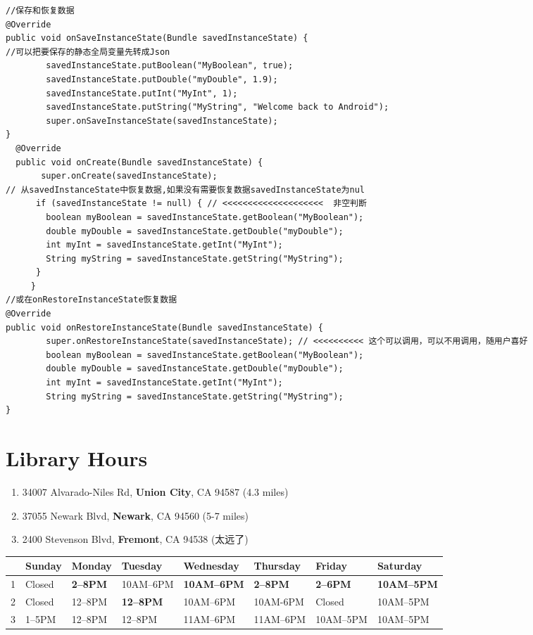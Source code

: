 \documentclass[9pt, b5paper]{article}
\begin{document}
\begin{verbatim}
//保存和恢复数据
@Override
public void onSaveInstanceState(Bundle savedInstanceState) {
//可以把要保存的静态全局变量先转成Json
        savedInstanceState.putBoolean("MyBoolean", true);
        savedInstanceState.putDouble("myDouble", 1.9);
        savedInstanceState.putInt("MyInt", 1);
        savedInstanceState.putString("MyString", "Welcome back to Android");
        super.onSaveInstanceState(savedInstanceState);
}
  @Override
  public void onCreate(Bundle savedInstanceState) {
       super.onCreate(savedInstanceState);
// 从savedInstanceState中恢复数据,如果没有需要恢复数据savedInstanceState为nul 
      if (savedInstanceState != null) { // <<<<<<<<<<<<<<<<<<<<  非空判断
        boolean myBoolean = savedInstanceState.getBoolean("MyBoolean");
        double myDouble = savedInstanceState.getDouble("myDouble");
        int myInt = savedInstanceState.getInt("MyInt");
        String myString = savedInstanceState.getString("MyString");
      }
     }
//或在onRestoreInstanceState恢复数据
@Override
public void onRestoreInstanceState(Bundle savedInstanceState) {
        super.onRestoreInstanceState(savedInstanceState); // <<<<<<<<<< 这个可以调用，可以不用调用，随用户喜好 
        boolean myBoolean = savedInstanceState.getBoolean("MyBoolean");
        double myDouble = savedInstanceState.getDouble("myDouble");
        int myInt = savedInstanceState.getInt("MyInt");
        String myString = savedInstanceState.getString("MyString");
}
\end{verbatim}
\section{Library Hours}
\label{sec-12}
\begin{enumerate}
\item 34007 Alvarado-Niles Rd, \textbf{Union City}, CA 94587 (4.3 miles)
\item 37055 Newark Blvd, \textbf{Newark}, CA 94560 (5-7 miles)
\item 2400 Stevenson Blvd, \textbf{Fremont}, CA 94538 (太远了)
\end{enumerate}
\begin{center}
\begin{tabular}{rlllllll}
\hline
 & Sunday & Monday & Tuesday & Wednesday & Thursday & Friday & Saturday\\
\hline
1 & Closed & \textbf{2–8PM} & 10AM–6PM & \textbf{10AM–6PM} & \textbf{2–8PM} & \textbf{2–6PM} & \textbf{10AM–5PM}\\
2 & Closed & 12–8PM & \textbf{12–8PM} & 10AM–6PM & 10AM-6PM & Closed & 10AM–5PM\\
3 & 1–5PM & 12–8PM & 12–8PM & 11AM–6PM & 11AM–6PM & 10AM–5PM & 10AM–5PM\\
\end{tabular}
\end{center}
\end{document}
